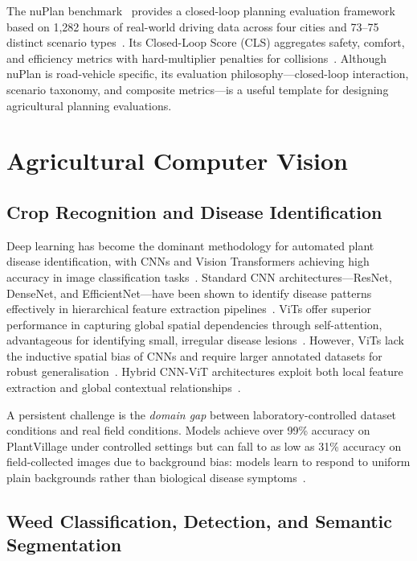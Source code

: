 \documentclass[12pt, a4paper]{article}
\begin{document}
The nuPlan benchmark~\cite{ref139, ref140, ref141} provides a closed-loop planning
evaluation framework based on 1,282 hours of real-world driving data across four cities
and 73--75 distinct scenario types~\cite{ref139, ref141}. Its Closed-Loop Score (CLS)
aggregates safety, comfort, and efficiency metrics with hard-multiplier penalties for
collisions~\cite{ref140, ref141}. Although nuPlan is road-vehicle specific, its evaluation
philosophy---closed-loop interaction, scenario taxonomy, and composite metrics---is a
useful template for designing agricultural planning evaluations.

\section{Agricultural Computer Vision}

\subsection{Crop Recognition and Disease Identification}

Deep learning has become the dominant methodology for automated plant disease
identification, with CNNs and Vision Transformers achieving high accuracy in image
classification tasks~\cite{ref149, ref150, ref153}. Standard CNN architectures---ResNet,
DenseNet, and EfficientNet---have been shown to identify disease patterns effectively in
hierarchical feature extraction pipelines~\cite{ref154}. ViTs offer superior performance
in capturing global spatial dependencies through self-attention, advantageous for
identifying small, irregular disease lesions~\cite{ref150, ref156}. However, ViTs lack
the inductive spatial bias of CNNs and require larger annotated datasets for robust
generalisation~\cite{ref195, ref197}. Hybrid CNN-ViT architectures exploit both local
feature extraction and global contextual relationships~\cite{ref150, ref196, ref200}.

A persistent challenge is the \emph{domain gap} between laboratory-controlled dataset
conditions and real field conditions. Models achieve over 99\% accuracy on PlantVillage
under controlled settings but can fall to as low as 31\% accuracy on field-collected images
due to background bias: models learn to respond to uniform plain backgrounds rather than
biological disease symptoms~\cite{ref154, ref203, ref204}.

\subsection{Weed Classification, Detection, and Semantic Segmentation}
\end{document}
